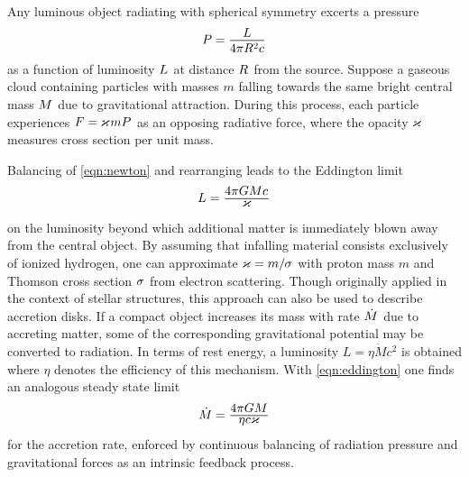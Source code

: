 Any luminous object radiating with spherical symmetry excerts a pressure
\begin{equation*}
	P = \frac{\raisebox{-0.3ex}{$L$}}{4\pi R^2 c}
\end{equation*}
as a function of luminosity $L \kern+0.5pt$ at distance $R \kern+0.5pt$ from the source.
Suppose a gaseous cloud containing particles with masses $m$ falling towards the same bright central mass $M \kern+0.5pt$
due to gravitational attraction. During this process, each particle experiences $F = \kern-0.3pt \varkappa \kern+0.7pt mP \kern+0.5pt$
as an opposing radiative force, where the opacity $\kern-0.3pt \varkappa \kern+0.7pt$ measures cross section per unit mass.

\newpage Balancing of \eqref{eqn:newton} and rearranging leads to the Eddington limit
\begin{equation}
	L = \frac{\raisebox{-0.3ex}{$4\pi GM c \kern+0.4pt$}}{\raisebox{0.8ex}{$\varkappa$}}
	\label{eqn:eddington}
\end{equation}
on the luminosity beyond which additional matter is immediately blown away from the central object. By assuming that infalling
material consists exclusively of ionized hydrogen, one can approximate $\varkappa \kern-0.1pt = m / \kern-0.5pt \sigma \kern+0.3pt$
with proton mass $m$ and Thomson cross section $\sigma \kern+0.5pt$ from electron scattering. Though originally applied in the
context of stellar structures, this approach can also be used to describe accretion disks. If a compact object increases its mass
with rate $\dot{M} \kern+0.5pt$ due to accreting matter, some of the corresponding gravitational potential may be converted to
radiation. In terms of rest energy, a luminosity $L = \eta\dot{M}c^2$ is obtained where $\eta$ denotes the efficiency of this
mechanism. With \eqref{eqn:eddington} one finds an analogous steady state limit
\begin{equation*}
	\dot{M} \kern-0.2pt = \frac{\raisebox{-0.3ex}{$4\pi GM$}}{\raisebox{0.8ex}{$\eta c \varkappa$}}
\end{equation*}
for the accretion rate, enforced by continuous balancing of radiation pressure and gravitational forces as an intrinsic feedback process.
